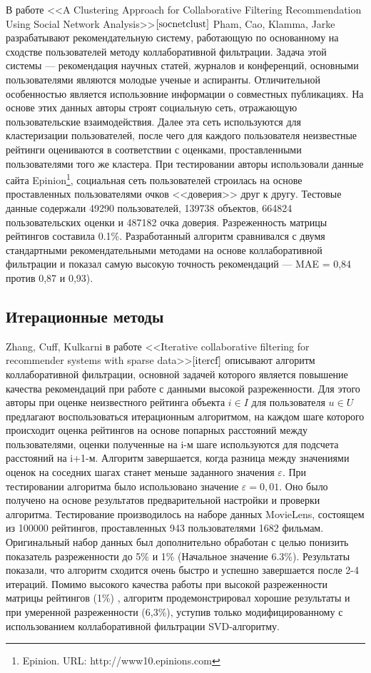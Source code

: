 \documentclass[a4paper, 12pt]{article} %
\begin{document}
\par В работе <<A Clustering Approach for Collaborative Filtering Recommendation Using Social Network Analysis>>$\cite{socnetclust}$ Pham, Cao, Klamma, Jarke разрабатывают рекомендательную систему, работающую по основанному на сходстве пользователей методу коллаборативной фильтрации. Задача этой системы --- рекомендация научных статей, журналов и конференций, основными пользователями являются молодые ученые и аспиранты. Отличительной особенностью является использовние информации о совместных публикациях. На основе этих данных авторы строят социальную сеть, отражающую пользовательские взаимодействия. Далее эта сеть используются для кластеризации пользователей, после чего для каждого пользователя неизвестные рейтинги оцениваются в соответствии с оценками, проставленными пользователями того же кластера. При тестировании авторы использовали данные сайта Epinion\footnote{Epinion. URL: http://www10.epinions.com}, социальная сеть пользователей строилась на основе проставленных пользователями очков <<доверия>> друг к другу. Тестовые данные содержали 49290 пользователей, 139738 объектов, 664824 пользовательских оценки и 487182 очка доверия. Разреженность матрицы рейтингов составила 0.1\%. Разработанный алгоритм сравнивался с двумя стандартными рекомендательными методами на основе коллаборативной фильтрации и показал самую высокую точность рекомендаций --- MAE = 0,84 против 0,87 и 0,93).  

\subsection{Итерационные методы}
\par
Zhang, Cuff, Kulkarni в работе <<Iterative collaborative filtering for recommender systems with sparse data>>$\cite{itercf}$ описывают алгоритм коллаборативной фильтрации, основной задачей которого является повышение качества рекомендаций при работе с данными высокой разреженности. Для этого авторы при оценке неизвестного рейтинга объекта $i \in I$ для пользователя $u \in U$ предлагают воспользоваться итерационным алгоритмом, на каждом шаге которого происходит оценка рейтингов на основе попарных расстояний между пользователями, оценки полученные на i-м шаге используются для подсчета расстояний на i+1-м. Алгоритм завершается, когда разница между значениями оценок на соседних шагах станет меньше заданного значения $\varepsilon$. При тестировании алгоритма было использовано значение $\varepsilon=0,01$. Оно было получено на основе результатов предварительной настройки и проверки алгоритма. Тестирование производилось на наборе данных MovieLens, состоящем из 100000 рейтингов, проставленных 943 пользователями 1682 фильмам. Оригинальный набор данных был дополнительно обработан с целью понизить показатель разреженности до 5\% и 1\% (Начальное значение 6.3\%). Результаты показали, что алгоритм сходится очень быстро и успешно завершается после 2-4 итераций. Помимо высокого качества работы при высокой разреженности матрицы рейтингов (1\%) , алгоритм продемонстрировал хорошие результаты и при умеренной разреженности (6,3\%), уступив только модифицированному с использованием коллаборативной фильтрации SVD-алгоритму\cite{cfbasedsvd}.
\end{document}
